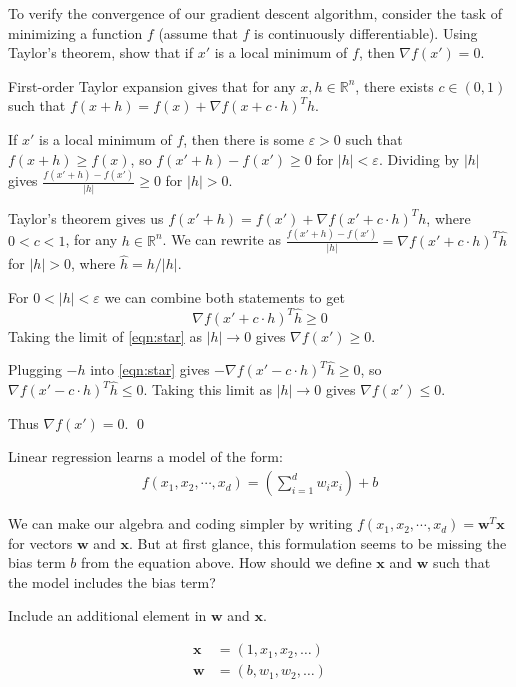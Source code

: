 \begin{problem}[3]
    To verify the convergence of our gradient descent algorithm, consider the task of minimizing a function $f$ (assume that $f$ is continuously differentiable). Using Taylor's theorem, show that if $x'$ is a local minimum of $f$, then $\nabla f(x') = 0$. 
\end{problem}
\begin{hint}
  First-order Taylor expansion gives that for any $x, h \in \mathbb{R}^n$, there exists $c \in (0, 1)$ such that $f(x + h) = f(x) + \nabla f(x + c\cdot h)^T h$.
  
\end{hint}
\begin{solution}
  If $x'$ is a local minimum of $f$, then there is some $\varepsilon > 0$ such that $f(x+h) \geq f(x)$, so $f(x' + h) - f(x') \geq 0$ for $|h| < \varepsilon$.
  Dividing by $|h|$ gives $\frac{ f(x' + h) - f(x') }{ |h| } \geq 0$ for $|h| > 0$.

  Taylor's theorem gives us $f(x' + h) = f(x') + \nabla f(x' + c\cdot h)^T h$, where $0 < c < 1$, for any $h \in \mathbb{R}^n$.
  We can rewrite as $\frac{ f(x' + h) - f(x') }{ |h| } = \nabla f(x' + c \cdot h)^T \hat{h}$ for $|h| > 0$, where $\hat{h} = h / |h|$.

  For $0 < |h| < \varepsilon$ we can combine both statements to get
  \begin{equation}\label{eqn:star} \nabla f(x' + c \cdot h)^T \hat{h} \geq 0 \tag{*} \end{equation}
  Taking the limit of \eqref{eqn:star} as $|h| \to 0$ gives $\nabla f(x') \geq 0$.

  Plugging $-h$ into \eqref{eqn:star} gives $-\nabla f(x' - c \cdot h)^T \hat{h} \geq 0$, so $\nabla f(x' - c \cdot h)^T \hat{h} \leq 0$.
  Taking this limit as $|h| \to 0$ gives $\nabla f(x') \leq 0$.

  Thus $\nabla f(x') = 0$.
  \qed
\end{solution}

Linear regression learns a model of the form:
\begin{align*}
  f(x_1, x_2, \cdots, x_d) = \left(\sum_{i=1}^d w_i x_i\right) + b
\end{align*}

\begin{problem}[1]
  We can make our algebra and coding simpler by writing $f(x_1, x_2, \cdots, x_d) = \mathbf{w}^T\mathbf{x}$ for vectors $\mathbf{w}$ and $\mathbf{x}$.  But at first glance, this formulation seems to be missing the bias term $b$ from the equation above.  How should we define $\mathbf{x}$ and $\mathbf{w}$ such that the model includes the bias term?
\end{problem}
\begin{hint}
  Include an additional element in $\mathbf{w}$ and $\mathbf{x}$.
\end{hint}
\begin{solution}
  \begin{align*}
    \mathbf{x} &= (1, x_1, x_2, \dots) \\
    \mathbf{w} &= (b, w_1, w_2, \dots)
  \end{align*}
\end{solution}

